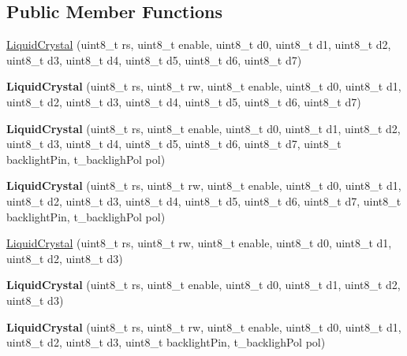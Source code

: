 \subsection*{Public Member Functions}
\begin{DoxyCompactItemize}
\item 
\hyperlink{class_liquid_crystal_a49d2bd8d26031a1c83bcbd73978a1686}{Liquid\+Crystal} (uint8\+\_\+t rs, uint8\+\_\+t enable, uint8\+\_\+t d0, uint8\+\_\+t d1, uint8\+\_\+t d2, uint8\+\_\+t d3, uint8\+\_\+t d4, uint8\+\_\+t d5, uint8\+\_\+t d6, uint8\+\_\+t d7)
\item 
\hypertarget{class_liquid_crystal_a30e3d865c4b4a003a36cb45903f93644}{}{\bfseries Liquid\+Crystal} (uint8\+\_\+t rs, uint8\+\_\+t rw, uint8\+\_\+t enable, uint8\+\_\+t d0, uint8\+\_\+t d1, uint8\+\_\+t d2, uint8\+\_\+t d3, uint8\+\_\+t d4, uint8\+\_\+t d5, uint8\+\_\+t d6, uint8\+\_\+t d7)\label{class_liquid_crystal_a30e3d865c4b4a003a36cb45903f93644}

\item 
\hypertarget{class_liquid_crystal_aff2330186495fde93370d46c0ca2cbf0}{}{\bfseries Liquid\+Crystal} (uint8\+\_\+t rs, uint8\+\_\+t enable, uint8\+\_\+t d0, uint8\+\_\+t d1, uint8\+\_\+t d2, uint8\+\_\+t d3, uint8\+\_\+t d4, uint8\+\_\+t d5, uint8\+\_\+t d6, uint8\+\_\+t d7, uint8\+\_\+t backlight\+Pin, t\+\_\+backligh\+Pol pol)\label{class_liquid_crystal_aff2330186495fde93370d46c0ca2cbf0}

\item 
\hypertarget{class_liquid_crystal_ae0c3c8f7661634b1400f00a1c9c02c26}{}{\bfseries Liquid\+Crystal} (uint8\+\_\+t rs, uint8\+\_\+t rw, uint8\+\_\+t enable, uint8\+\_\+t d0, uint8\+\_\+t d1, uint8\+\_\+t d2, uint8\+\_\+t d3, uint8\+\_\+t d4, uint8\+\_\+t d5, uint8\+\_\+t d6, uint8\+\_\+t d7, uint8\+\_\+t backlight\+Pin, t\+\_\+backligh\+Pol pol)\label{class_liquid_crystal_ae0c3c8f7661634b1400f00a1c9c02c26}

\item 
\hyperlink{class_liquid_crystal_a0a0a8dfa7a2e775a031fd65f5c6366ec}{Liquid\+Crystal} (uint8\+\_\+t rs, uint8\+\_\+t rw, uint8\+\_\+t enable, uint8\+\_\+t d0, uint8\+\_\+t d1, uint8\+\_\+t d2, uint8\+\_\+t d3)
\item 
\hypertarget{class_liquid_crystal_a23124e6dd5ac4a9b6147629b96e91953}{}{\bfseries Liquid\+Crystal} (uint8\+\_\+t rs, uint8\+\_\+t enable, uint8\+\_\+t d0, uint8\+\_\+t d1, uint8\+\_\+t d2, uint8\+\_\+t d3)\label{class_liquid_crystal_a23124e6dd5ac4a9b6147629b96e91953}

\item 
\hypertarget{class_liquid_crystal_a8b90122c67a6d14b967c8a11ba490670}{}{\bfseries Liquid\+Crystal} (uint8\+\_\+t rs, uint8\+\_\+t rw, uint8\+\_\+t enable, uint8\+\_\+t d0, uint8\+\_\+t d1, uint8\+\_\+t d2, uint8\+\_\+t d3, uint8\+\_\+t backlight\+Pin, t\+\_\+backligh\+Pol pol)\label{class_liquid_crystal_a8b90122c67a6d14b967c8a11ba490670}


\end{DoxyCompactItemize}

